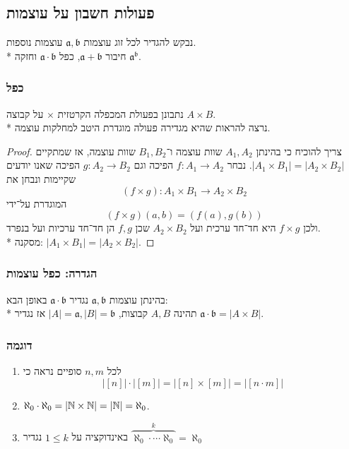 \subsection{פעולות חשבון על עוצמות}
נבקש להגדיר לכל זוג עוצמות $\mathfrak{a}, \mathfrak{b}$ עוצמות נוספות. \\*
חיבור $\mathfrak{a} + \mathfrak{b}$, כפל $\mathfrak{a} \cdot \mathfrak{b}$ וחזקה $\mathfrak{a}^\mathfrak{b}$.

\subsubsection{כפל}
נתבונן בפעולת המכפלה הקרטזית $\times$ על קבוצה $A \times B$. \\*
נרצה להראות שהיא מגדירה פעולה מוגדרת היטב למחלקות עוצמה.
\begin{proof}
	צריך להוכיח כי בהינתן $A_1, A_2$ שוות עוצמה ו־$B_1, B_2$ שוות עוצמה, אז שמתקיים $|A_1 \times B_1| = |A_2 \times B_2|$.
	נבחר $f : A_1 \to A_2$ הפיכה וגם $g : A_2 \to B_2$ הפיכה שאנו יודעים שקיימות ונבחן את
	\[
		(f \times g) : A_1 \times B_1 \to A_2 \times B_2
	\]
	המוגדרת על־ידי
	\[
		(f \times g)(a, b) = (f(a), g(b))
	\]
	ולכן $f \times g$ היא חד־חד ערכית ועל $A_2 \times B_2$ שכן $f, g$ הן חד־חד ערכיות ועל בנפרד. \\*
	מסקנה: $|A_1 \times B_1| = |A_2 \times B_2|$.
\end{proof}

\subsubsection{הגדרה: כפל עוצמות}
בהינתן עוצמות $\mathfrak{a}, \mathfrak{b}$ נגדיר $\mathfrak{a} \cdot \mathfrak{b}$ באופן הבא: \\*
תהינה $A, B$ קבוצות, $|A| = \mathfrak{a}, |B| = \mathfrak{b}$ אז נגדיר $\mathfrak{a} \cdot \mathfrak{b} = |A \times B|$.

\subsubsection{דוגמה}
\begin{enumerate}
	\item לכל $n, m$ סופיים נראה כי
		\[
			|[n]| \cdot |[m]| = |[n] \times [m]| = |[n \cdot m]|
		\]
	\item $\aleph_0 \cdot \aleph_0 = | \mathbb{N} \times \mathbb{N}| = |\mathbb{N}| = \aleph_0$.
	\item באינדוקציה על $1 \le k$ נגדיר $\overbrace{\aleph_0 \cdot \cdots \aleph_0}^k = \aleph_0$
\end{enumerate}

